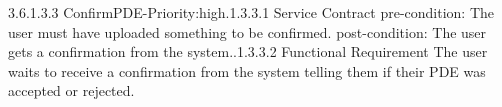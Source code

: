 \documentclass[a4paper,12pt]{article}
\begin{document}
3.6.1.3.3 ConfirmPDE-Priority:high.1.3.3.1 Service Contract\newline
	pre-condition: The user must have uploaded something to be confirmed.\newline
	post-condition: The user gets a confirmation from the system..1.3.3.2 Functional Requirement\newline
	The user waits to receive a confirmation from the system telling them if their PDE was accepted or rejected.\newline
\end{document}
